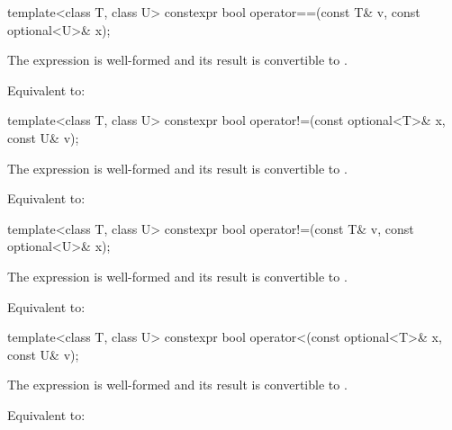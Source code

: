 %
\begin{itemdecl}
template<class T, class U> constexpr bool operator==(const T& v, const optional<U>& x);
\end{itemdecl}

\begin{itemdescr}
\pnum
\mandates
The expression  is well-formed and
its result is convertible to .

\pnum
\effects
Equivalent to: 
\end{itemdescr}

%
\begin{itemdecl}
template<class T, class U> constexpr bool operator!=(const optional<T>& x, const U& v);
\end{itemdecl}

\begin{itemdescr}
\pnum
\mandates
The expression  is well-formed and
its result is convertible to .

\pnum
\effects
Equivalent to: 
\end{itemdescr}

%
\begin{itemdecl}
template<class T, class U> constexpr bool operator!=(const T& v, const optional<U>& x);
\end{itemdecl}

\begin{itemdescr}
\pnum
\mandates
The expression  is well-formed and
its result is convertible to .

\pnum
\effects
Equivalent to: 
\end{itemdescr}

%
\begin{itemdecl}
template<class T, class U> constexpr bool operator<(const optional<T>& x, const U& v);
\end{itemdecl}

\begin{itemdescr}
\pnum
\mandates
The expression  is well-formed and
its result is convertible to .

\pnum
\effects
Equivalent to: 
\end{itemdescr}

